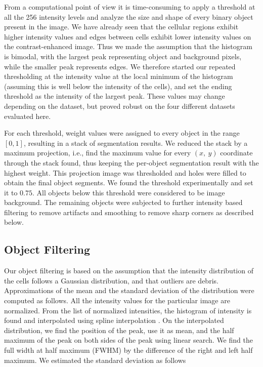 \documentclass[journal]{IEEEtran}
\begin{document}
From a computational point of view it is time-consuming to apply a threshold at all the 256 intensity levels and analyze the size and shape of every binary object present in the image. We have already seen that the cellular regions exhibit higher intensity values and edges between cells exhibit lower intensity values on the contrast-enhanced image. Thus we made the assumption that the histogram is bimodal, with the largest peak representing object and background pixels, while the smaller peak represents edges. We therefore started our repeated thresholding at the intensity value at the local minimum of the histogram (assuming this is well below the intensity of the cells), and set the ending threshold as the intensity of the largest peak. These values may change depending on the dataset, but proved robust on the four different datasets evaluated here.

For each threshold, weight values were assigned to every object in the range $[0, 1]$, resulting in a stack of segmentation results. We reduced the stack by a maximum projection, i.e., find the maximum value for every $(x,~y)$ coordinate through the stack found, thus keeping the per-object segmentation result with the highest weight. This projection image was thresholded and holes were filled to obtain the final object segments. We found the threshold experimentally and set it to $0.75$. All objects below this threshold were considered to be image background. The remaining objects were subjected to further intensity based filtering to remove artifacts and smoothing to remove sharp corners as described below. 

\subsection{Object Filtering}

Our object filtering is based on the assumption that the intensity distribution of the cells follows a Gaussian distribution, and that outliers are debris. Approximations of the mean and the  standard deviation of the distribution were computed as follows. All the intensity values for the particular image are normalized. From the list of normalized intensities, the histogram of intensity is found and interpolated using spline interpolation \cite {jonesscipy2001}. On the interpolated distribution, we find the position of the peak, use it as mean, and the half maximum of the peak on both sides of the peak using linear search. We find the full width at half maximum (FWHM) by the difference of the right and left half maximum. We estimated the standard deviation  \cite {weissteinfull} as follows  
\end{document}
